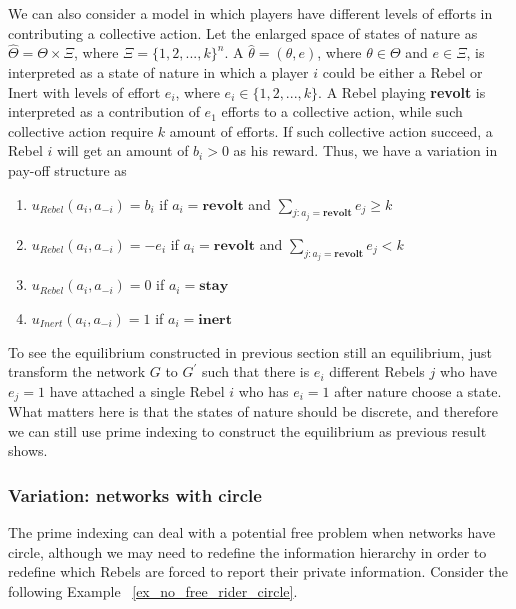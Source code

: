 \documentclass[12pt,letter]{article}
\theoremstyle{definition}
\theoremstyle{remark}
\theoremstyle{claim}
\begin{document}
We can also consider a model in which players have different levels of efforts in contributing a collective action. Let the enlarged space of states of nature as $\hat{\Theta}=\Theta \times \Xi$, where $\Xi=\{1,2,...,k\}^n$. A $\hat{\theta}=(\theta,e)$, where $\theta\in \Theta$ and $e\in \Xi$, is interpreted as a state of nature in which a player $i$ could be either a Rebel or Inert with levels of effort $e_i$, where $e_i\in \{1,2,...,k\}$. A Rebel playing \textbf{revolt} is interpreted as a contribution of $e_1$ efforts to a collective action, while such collective action require $k$ amount of efforts. If such collective action succeed, a Rebel $i$ will get an amount of $b_i>0$ as his reward. Thus, we have a variation in pay-off structure as
\begin{enumerate}
\item $u_{Rebel}(a_i,a_{-i})=b_i$ if $a_i=\textbf{revolt}$ and $\sum_{j:a_j=\textbf{revolt}}e_j\geq k$
\item $u_{Rebel}(a_i,a_{-i})=-e_i$ if $a_i=\textbf{revolt}$ and $\sum_{j:a_j=\textbf{revolt}}e_j< k$
\item $u_{Rebel}(a_i,a_{-i})=0$ if $a_i=\textbf{stay}$
\item $u_{Inert}(a_i,a_{-i})=1$ if $a_i=\textbf{inert}$
\end{enumerate}

To see the equilibrium constructed in previous section still an equilibrium, just transform the network $G$ to $G^{'}$ such that there is $e_i$ different Rebels $j$ who have $e_j=1$ have attached a single Rebel $i$ who has $e_i=1$ after nature choose a state. What matters here is that the states of nature should be discrete, and therefore we can still use prime indexing to construct the equilibrium as previous result shows.


\subsubsection{Variation: networks with circle}

The prime indexing can deal with a potential free problem when networks have circle, although we may need to redefine the information hierarchy in order to redefine which Rebels are forced to report their private information. Consider the following Example ~\ref{ex_no_free_rider_circle}.
\end{document}
